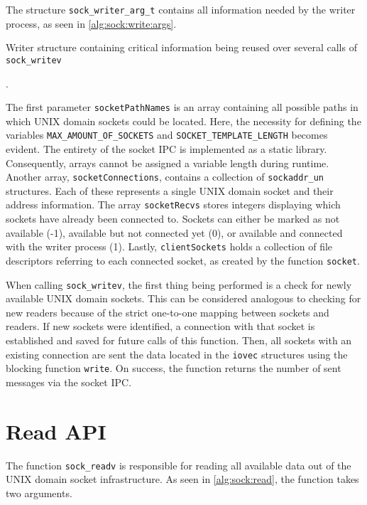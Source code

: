 The structure \texttt{sock\_writer\_arg\_t} contains all information needed by the writer process, as seen in \ref{alg:sock:write:args}.

\begin{algorithm}[h!]
    
    \caption[Socket: Writer structure]{Writer structure containing critical information being reused over several calls of \texttt{sock\_writev}}.
    \label{alg:sock:write:args}
\end{algorithm}

The first parameter \texttt{socketPathNames} is an array containing all possible paths in which UNIX domain sockets could be located.
Here, the necessity for defining the variables \texttt{MAX\_AMOUNT\_OF\_SOCKETS} and \texttt{SOCKET\_TEMPLATE\_LENGTH} becomes evident.
The entirety of the socket \ac{IPC} is implemented as a static library.
Consequently, arrays cannot be assigned a variable length during runtime.
Another array, \texttt{socketConnections}, contains a collection of \texttt{sockaddr\_un} structures.
Each of these represents a single UNIX domain socket and their address information.
The array \texttt{socketRecvs} stores integers displaying which sockets have already been connected to.
Sockets can either be marked as not available (-1), available but not connected yet (0), or available and connected with the writer process (1).
Lastly, \texttt{clientSockets} holds a collection of file descriptors referring to each connected socket, as created by the function \texttt{socket}.

When calling \texttt{sock\_writev}, the first thing being performed is a check for newly available UNIX domain sockets.
This can be considered analogous to checking for new readers because of the strict one-to-one mapping between sockets and readers.
If new sockets were identified, a connection with that socket is established and saved for future calls of this function.
Then, all sockets with an existing connection are sent the data located in the \texttt{iovec} structures using the blocking function \texttt{write}.
On success, the function returns the number of sent messages via the socket \ac{IPC}.

\section{Read \ac{API}}
\label{cha:ReadAPI}
The function \texttt{sock\_readv} is responsible for reading all available data out of the UNIX domain socket infrastructure.
As seen in \ref{alg:sock:read}, the function takes two arguments.

